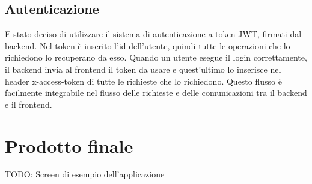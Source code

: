 \subsection{Autenticazione}
E stato deciso di utilizzare il sistema di autenticazione a token JWT, firmati
dal backend.
Nel token è inserito l'id dell'utente, quindi tutte le operazioni che lo
richiedono lo recuperano da esso.
Quando un utente esegue il login correttamente, il backend invia al frontend
il token da usare e quest’ultimo lo inserisce nel header x-access-token di tutte
le richieste che lo richiedono.
Questo flusso è facilmente integrabile nel flusso delle richieste e delle comunicazioni tra il backend e il frontend.

\section{Prodotto finale}
TODO: Screen di esempio dell'applicazione
